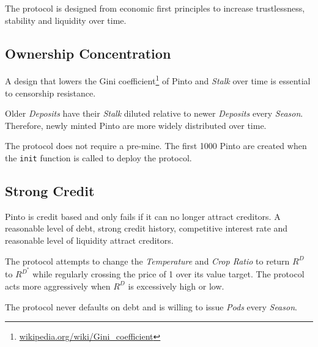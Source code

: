 \documentclass[tikz]{article}
\newcommand{\code}[1]{\texttt{#1}}
\newcommand{\term}[1]{\textsl{#1}}
\newcommand{\fref}[1]{\footnote{\href{http://#1}{#1}}}
\newcommand{\Pinto}{} %
\renewcommand{\Pinto}{\usebox{\cachePinto}}
\begin{document}
The protocol is designed from economic first principles to increase trustlessness, stability and liquidity over time.


\vspace{0.1cm}
\subsection{Ownership Concentration}
\vspace{0.1cm}

A design that lowers the Gini coefficient\fref{wikipedia.org/wiki/Gini\_coefficient} of Pinto and \term{Stalk} over time is essential to censorship resistance.

\vspace{0.1cm}

Older \term{Deposits} have their \term{Stalk} diluted relative to newer \term{Deposits} every \term{Season}. Therefore, newly minted Pinto are more widely distributed over time.

\vspace{0.1cm}

The protocol does not require a pre-mine. The first 1000 Pinto are created when the \code{init} function is called to deploy the protocol.


\vspace{0.1cm}
\subsection{Strong Credit}
\vspace{0.1cm}

Pinto is credit based and only fails if it can no longer attract creditors. A reasonable level of debt, strong credit history, competitive interest rate and reasonable level of liquidity attract creditors. 

\vspace{0.1cm}

The protocol attempts to change the \term{Temperature} and \term{Crop Ratio} to return $R^{D}$ to $R^{D^{*}}$ while regularly crossing the price of \Pinto1 over its value target. The protocol acts more aggressively when $R^{D}$ is excessively high or low.

\vspace{0.1cm}

The protocol never defaults on debt and is willing to issue \term{Pods} every \term{Season}. 
\end{document}
